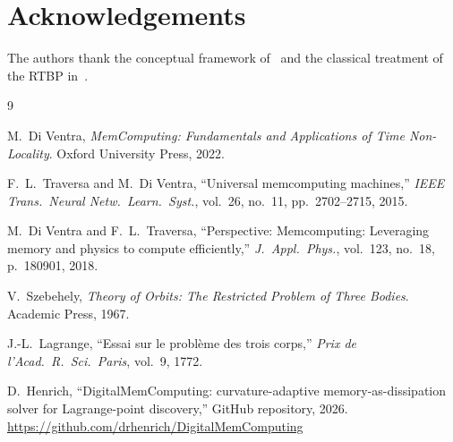 \documentclass[10pt,twocolumn]{article}
\begin{document}
\section*{Acknowledgements}
The authors thank the conceptual framework of~\cite{diventra2022} and the
classical treatment of the RTBP in~\cite{szebehely1967}.

\clearpage
\onecolumn

\begin{thebibliography}{9}
\setlength{\itemsep}{2pt}

M.~Di Ventra, \textit{MemComputing: Fundamentals and Applications of Time
Non-Locality}. Oxford University Press, 2022.

F.~L.~Traversa and M.~Di Ventra, ``Universal memcomputing machines,''
\textit{IEEE Trans.\ Neural Netw.\ Learn.\ Syst.}, vol.~26, no.~11,
pp.~2702--2715, 2015.

M.~Di Ventra and F.~L.~Traversa, ``Perspective: Memcomputing: Leveraging memory
and physics to compute efficiently,'' \textit{J.~Appl.\ Phys.}, vol.~123,
no.~18, p.~180901, 2018.

V.~Szebehely, \textit{Theory of Orbits: The Restricted Problem of Three Bodies}.
Academic Press, 1967.

J.-L.~Lagrange, ``Essai sur le probl\`eme des trois corps,'' \textit{Prix de
l'Acad.\ R.\ Sci.\ Paris}, vol.~9, 1772.

D.~Henrich, ``DigitalMemComputing: curvature-adaptive memory-as-dissipation
solver for Lagrange-point discovery,'' GitHub repository, 2026.
\url{https://github.com/drhenrich/DigitalMemComputing}

\end{thebibliography}
\end{document}
